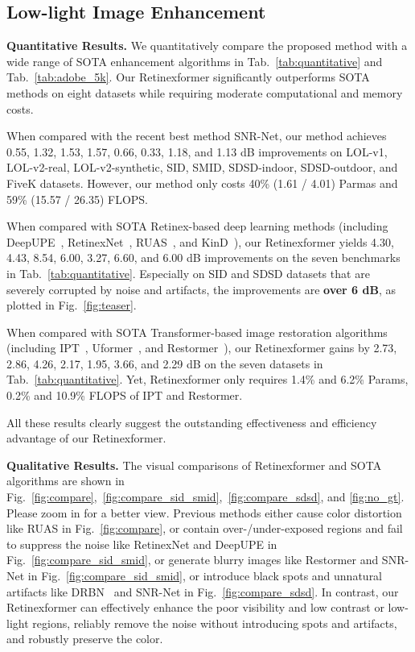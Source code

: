 \documentclass[10pt,twocolumn,letterpaper]{article}
\begin{document}
\subsection{Low-light Image Enhancement}
\noindent\textbf{Quantitative Results.} We quantitatively compare the proposed method with a wide range of SOTA enhancement algorithms in Tab.~\ref{tab:quantitative} and Tab.~\ref{tab:adobe_5k}. Our Retinexformer significantly outperforms SOTA methods on eight datasets while requiring moderate computational and memory costs. 

When compared with the recent best method SNR-Net, our method achieves 0.55, 1.32, 1.53, 1.57, 0.66, 0.33, 1.18, and 1.13 dB improvements on LOL-v1, LOL-v2-real, LOL-v2-synthetic, SID, SMID, SDSD-indoor, SDSD-outdoor, and FiveK datasets. However, our method only costs 40\% (1.61 / 4.01) Parmas and 59\% (15.57 / 26.35) FLOPS.

When compared with SOTA Retinex-based deep learning methods (including DeepUPE~\cite{deep_upe}, RetinexNet~\cite{retinex_net}, RUAS~\cite{ruas}, and KinD~\cite{kind}), our Retinexformer yields 4.30, 4.43, 8.54, 6.00, 3.27, 6.60, and 6.00 dB improvements on the seven benchmarks in Tab.~\ref{tab:quantitative}. Especially on SID and SDSD datasets that are severely corrupted by noise and artifacts, the improvements are \textbf{over 6 dB}, as plotted in Fig.~\ref{fig:teaser}. 

When compared with SOTA Transformer-based image restoration algorithms (including IPT~\cite{ipt}, Uformer~\cite{uformer}, and Restormer~\cite{restormer}), our Retinexformer gains by 2.73, 2.86, 4.26, 2.17, 1.95, 3.66, and 2.29 dB on the seven datasets in Tab.~\ref{tab:quantitative}. Yet, Retinexformer only requires  1.4\% and 6.2\% Params, 0.2\% and 10.9\% FLOPS of IPT and Restormer.

All these results clearly suggest the outstanding effectiveness and efficiency advantage of our Retinexformer.

\vspace{1mm}
\noindent\textbf{Qualitative Results.} The visual comparisons of Retinexformer and SOTA algorithms are shown in Fig.~\ref{fig:compare},~\ref{fig:compare_sid_smid},~\ref{fig:compare_sdsd}, and \ref{fig:no_gt}. Please zoom in for a better view. Previous methods either cause color distortion like RUAS in Fig.~\ref{fig:compare}, or contain over-/under-exposed regions and fail to suppress the noise like RetinexNet and DeepUPE in Fig.~\ref{fig:compare_sid_smid}, or generate blurry images like Restormer and SNR-Net in Fig.~\ref{fig:compare_sid_smid}, or introduce black spots and unnatural artifacts like DRBN~\cite{drbn} and SNR-Net in Fig.~\ref{fig:compare_sdsd}. In contrast, our Retinexformer can effectively enhance the poor visibility and low contrast or low-light regions, reliably remove the noise without introducing  spots and artifacts, and robustly preserve the color.
\end{document}

